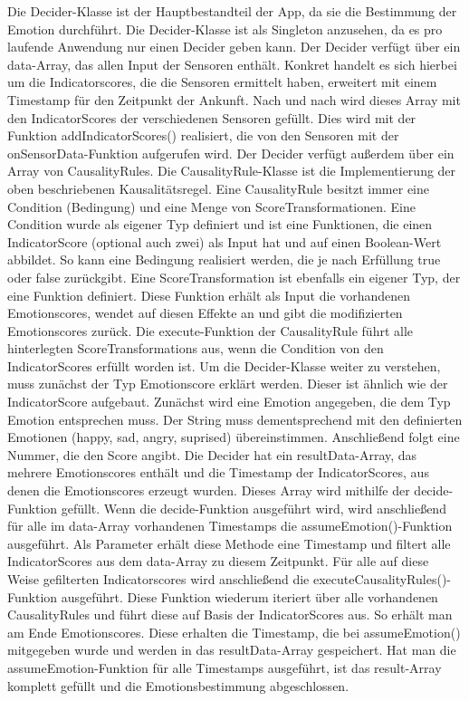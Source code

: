 Die Decider-Klasse ist der Hauptbestandteil der App, da sie die Bestimmung der Emotion durchführt. Die Decider-Klasse ist als Singleton anzusehen, da es pro laufende Anwendung nur einen Decider geben kann. Der Decider verfügt über ein data-Array, das allen Input der Sensoren enthält. Konkret handelt es sich hierbei um die Indicatorscores, die die Sensoren ermittelt haben, erweitert mit einem Timestamp für den Zeitpunkt der Ankunft. Nach und nach wird dieses Array mit den IndicatorScores der verschiedenen Sensoren gefüllt. Dies wird mit der Funktion addIndicatorScores() realisiert, die von den Sensoren mit der onSensorData-Funktion aufgerufen wird. \newline
Der Decider verfügt außerdem über ein Array von CausalityRules. Die CausalityRule-Klasse ist die Implementierung der oben beschriebenen Kausalitätsregel. Eine CausalityRule besitzt immer eine Condition (Bedingung) und eine Menge von ScoreTransformationen. \newline
Eine Condition wurde als eigener Typ definiert und ist eine Funktionen, die einen  IndicatorScore (optional auch zwei) als Input hat und auf einen Boolean-Wert abbildet. So kann eine Bedingung realisiert werden, die je nach Erfüllung true oder false zurückgibt. Eine ScoreTransformation ist ebenfalls ein eigener Typ, der eine Funktion definiert. Diese Funktion erhält als Input die vorhandenen Emotionscores, wendet auf diesen Effekte an und gibt die modifizierten Emotionscores zurück. \newline
Die execute-Funktion der CausalityRule führt alle hinterlegten ScoreTransformations aus, wenn die Condition von den IndicatorScores erfüllt worden ist. \newline
Um die Decider-Klasse weiter zu verstehen, muss zunächst der Typ Emotionscore erklärt werden. Dieser ist ähnlich wie der IndicatorScore aufgebaut. Zunächst wird eine Emotion angegeben, die dem Typ Emotion entsprechen muss. Der String muss dementsprechend mit den definierten Emotionen (happy, sad, angry, suprised) übereinstimmen. Anschließend folgt eine Nummer, die den Score angibt.\newline \newline
Die Decider hat ein resultData-Array, das mehrere Emotionscores enthält und die Timestamp der IndicatorScores, aus denen die Emotionscores erzeugt wurden. Dieses Array wird mithilfe der decide-Funktion gefüllt. Wenn die decide-Funktion ausgeführt wird, wird anschließend für alle im data-Array vorhandenen Timestamps die assumeEmotion()-Funktion ausgeführt. Als Parameter erhält diese Methode eine Timestamp und filtert alle IndicatorScores aus dem data-Array zu diesem Zeitpunkt. Für alle auf diese Weise gefilterten Indicatorscores wird anschließend die executeCausalityRules()-Funktion ausgeführt. Diese Funktion wiederum iteriert über alle vorhandenen CausalityRules und führt diese auf Basis der IndicatorScores aus. So erhält man am Ende Emotionscores. Diese erhalten die Timestamp, die bei assumeEmotion() mitgegeben wurde und werden in das resultData-Array gespeichert. Hat man die assumeEmotion-Funktion für alle Timestamps ausgeführt, ist das result-Array komplett gefüllt und die Emotionsbestimmung abgeschlossen.
